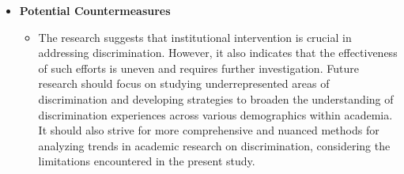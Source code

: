 \documentclass[runningheads]{llncs}
\begin{document}
\begin{itemize}
  \item \textbf{Potential Countermeasures}
  \begin{itemize}
      \item The research suggests that institutional intervention is crucial in addressing discrimination. However, it also indicates that the effectiveness of such efforts is uneven and requires further investigation. Future research should focus on studying underrepresented areas of discrimination and developing strategies to broaden the understanding of discrimination experiences across various demographics within academia. It should also strive for more comprehensive and nuanced methods for analyzing trends in academic research on discrimination, considering the limitations encountered in the present study.
  \end{itemize}
\end{itemize}


\nocite{*}


\end{document}
